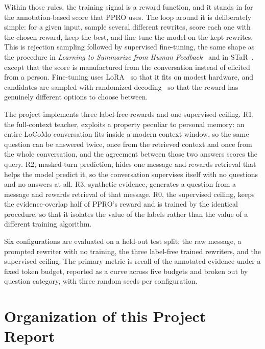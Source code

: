 \documentclass[12pt,letterpaper,oneside]{report}
\newcommand{\Rz}{R0}
\newcommand{\Ra}{R1}
\newcommand{\Rb}{R2}
\newcommand{\Rc}{R3}
\begin{document}
Within those rules, the training signal is a reward function, and it stands in
for the annotation-based score that PPRO uses. The loop around it is
deliberately simple: for a given input, sample several different rewrites, score
each one with the chosen reward, keep the best, and fine-tune the model on the
kept rewrites. This is rejection sampling followed by supervised fine-tuning,
the same shape as the procedure in \emph{Learning to Summarize from Human
Feedback}~\cite{summarize} and in STaR~\cite{star}, except that the score is
manufactured from the conversation instead of elicited from a person.
Fine-tuning uses LoRA~\cite{lora} so that it fits on modest hardware, and
candidates are sampled with randomized decoding~\cite{nucleus} so that the
reward has genuinely different options to choose between.

The project implements three label-free rewards and one supervised ceiling.
\Ra, the full-context teacher, exploits a property peculiar to personal memory:
an entire LoCoMo conversation fits inside a modern context window, so the same
question can be answered twice, once from the retrieved context and once from
the whole conversation, and the agreement between those two answers scores the
query. \Rb, masked-turn prediction, hides one message and rewards retrieval
that helps the model predict it, so the conversation supervises itself with no
questions and no answers at all. \Rc, synthetic evidence, generates a question
from a message and rewards retrieval of that message. \Rz, the supervised
ceiling, keeps the evidence-overlap half of PPRO's reward and is trained by the
identical procedure, so that it isolates the value of the labels rather than
the value of a different training algorithm.

Six configurations are evaluated on a held-out test split: the raw message, a
prompted rewriter with no training, the three label-free trained rewriters, and
the supervised ceiling. The primary metric is recall of the annotated evidence
under a fixed token budget, reported as a curve across five budgets and broken
out by question category, with three random seeds per configuration.

\section{Organization of this Project Report}
\label{sec:organization}
\end{document}

